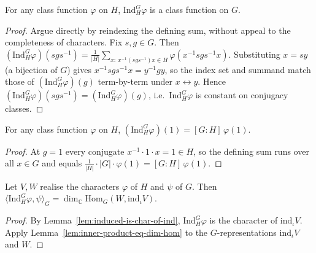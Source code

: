 \begin{lemma}
    \label{lem:induced-is-class-function}
    For any class function $\varphi$ on $H$, $\mathrm{Ind}_H^G \varphi$ is a
    class function on $G$.
\end{lemma}
\begin{proof}
    Argue directly by reindexing the defining sum, without appeal to the
    completeness of characters. Fix $s, g \in G$. Then
    $(\mathrm{Ind}_H^G\varphi)(s g s^{-1}) = \frac{1}{|H|}\sum_{x :\, x^{-1}(s g
    s^{-1})x \in H}\varphi(x^{-1} s g s^{-1} x)$. Substituting $x = s y$ (a
    bijection of $G$) gives $x^{-1} s g s^{-1} x = y^{-1} g y$, so the index set
    and summand match those of $(\mathrm{Ind}_H^G\varphi)(g)$ term-by-term under
    $x \leftrightarrow y$. Hence $(\mathrm{Ind}_H^G\varphi)(s g s^{-1}) =
    (\mathrm{Ind}_H^G\varphi)(g)$, i.e.\ $\mathrm{Ind}_H^G\varphi$ is constant on
    conjugacy classes.
\end{proof}

\begin{lemma}
    \label{lem:induced-value-at-one}
    \leanok
    For any class function $\varphi$ on $H$, $(\mathrm{Ind}_H^G \varphi)(1) =
    [G:H]\,\varphi(1)$.
\end{lemma}
\begin{proof}
    At $g = 1$ every conjugate $x^{-1}\cdot 1\cdot x = 1 \in H$, so the defining
    sum runs over all $x \in G$ and equals
    $\frac{1}{|H|}\cdot |G|\cdot \varphi(1) = [G:H]\,\varphi(1)$.
\end{proof}

\begin{lemma}
    \label{lem:ind-inner-as-hom-dim}
    \leanok
    Let $V, W$ realise the characters $\varphi$ of $H$ and $\psi$ of $G$. Then
    $\langle \mathrm{Ind}_H^G\varphi, \psi\rangle_G = \dim_{\mathbb{C}}
    \mathrm{Hom}_G(W, \mathrm{ind}_\iota V)$.
\end{lemma}
\begin{proof}
    By Lemma~\ref{lem:induced-is-char-of-ind}, $\mathrm{Ind}_H^G\varphi$ is the
    character of $\mathrm{ind}_\iota V$. Apply
    Lemma~\ref{lem:inner-product-eq-dim-hom} to the $G$-representations
    $\mathrm{ind}_\iota V$ and $W$.
\end{proof}

